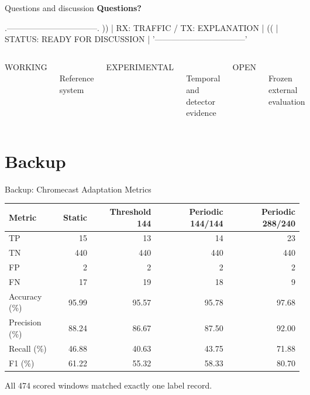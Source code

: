 \documentclass[aspectratio=169,10pt]{beamer}
\newcommand{\workingbadge}{%
  \colorbox{burgundy!13}{\color{darkburgundy}\scriptsize\bfseries\strut WORKING}}
\newcommand{\experimentalbadge}{%
  \colorbox{charcoal!13}{\color{charcoal}\scriptsize\bfseries\strut EXPERIMENTAL}}
\newcommand{\openbadge}{%
  \colorbox{dustyrose!18}{\color{burgundy}\scriptsize\bfseries\strut OPEN}}
\begin{document}
\begin{frame}[fragile]{Questions and discussion}
\centering
\vspace{0.35cm}
{\Huge\color{burgundy}\textbf{Questions?}}

\vspace{0.75cm}
\begin{asciiart}
      .---------------------------------.
  ))  | RX: TRAFFIC / TX: EXPLANATION  |  ((
      | STATUS: READY FOR DISCUSSION   |
      '---------------------------------'
\end{asciiart}

\vspace{0.75cm}
\begin{columns}[T,onlytextwidth]
\centering\workingbadge\\[0.18cm]
\small Reference system
\centering\experimentalbadge\\[0.18cm]
\small Temporal and detector evidence
\centering\openbadge\\[0.18cm]
\small Frozen external evaluation
\end{columns}
\end{frame}

\appendix
\section{Backup}

\begin{frame}{Backup: Chromecast Adaptation Metrics}
\centering
\small
\begin{tabular}{@{}lrrrr@{}}
\toprule
\textbf{Metric} & \textbf{Static} & \textbf{Threshold 144} &
\textbf{Periodic 144/144} & \textbf{Periodic 288/240}\\
\midrule
TP & 15 & 13 & 14 & 23\\
TN & 440 & 440 & 440 & 440\\
FP & 2 & 2 & 2 & 2\\
FN & 17 & 19 & 18 & 9\\
Accuracy (\%) & 95.99 & 95.57 & 95.78 & 97.68\\
Precision (\%) & 88.24 & 86.67 & 87.50 & 92.00\\
Recall (\%) & 46.88 & 40.63 & 43.75 & 71.88\\
F1 (\%) & 61.22 & 55.32 & 58.33 & 80.70\\
\bottomrule
\end{tabular}

\vspace{0.55cm}
All 474 scored windows matched exactly one label record.
\end{frame}
\end{document}
